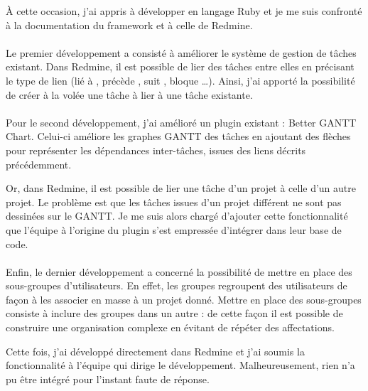 À cette occasion, j'ai appris à développer en langage Ruby et je me suis confronté à la documentation du framework \aror{} et à celle de Redmine.

\paragraph{}
Le premier développement a consisté à améliorer le système de gestion de tâches existant.
Dans Redmine, il est possible de lier des tâches entre elles en précisant le type de lien (\og lié à \fg, \og précède \fg, \og suit \fg, \og bloque \fg\ldots).
Ainsi, j'ai apporté la possibilité de créer à la volée une tâche à lier à une tâche existante.

\paragraph{}
Pour le second développement, j'ai amélioré un plugin existant : Better GANTT Chart.
Celui-ci améliore les graphes GANTT des tâches en ajoutant des flèches pour représenter les dépendances inter-tâches, issues des liens décrits précédemment.

Or, dans Redmine, il est possible de lier une tâche d'un projet à celle d'un autre projet.
Le problème est que les tâches issues d'un projet différent ne sont pas dessinées sur le GANTT. 
Je me suis alors chargé d'ajouter cette fonctionnalité que l'équipe à l'origine du plugin s'est empressée d'intégrer dans leur base de code.

\paragraph{}
Enfin, le dernier développement a concerné la possibilité de mettre en place des sous-groupes d'utilisateurs.
En effet, les groupes regroupent des utilisateurs de façon à les associer en masse à un projet donné.
Mettre en place des sous-groupes consiste à inclure des groupes dans un autre : de cette façon il est possible de construire une organisation complexe en évitant de répéter des affectations. 

Cette fois, j'ai développé directement dans Redmine et j'ai soumis la fonctionnalité à l'équipe qui dirige le développement.
Malheureusement, rien n'a pu être intégré pour l'instant faute de réponse.

